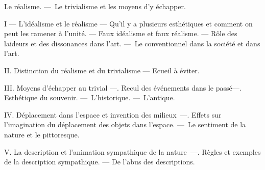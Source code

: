 \documentclass[french,twoside]{book} %
\newcommand\chaptercont{} %
\begin{document}
\begin{center}Le réalisme. — Le trivialisme et les moyens d’y échapper.\end{center}

\chaptercont
\noindent I — L’idéalisme et le réalisme — Qu’il y a plusieurs esthétiques et comment on peut les ramener à l’unité. — Faux idéalisme et faux réalisme. — Rôle des laideurs et des dissonances dans l’art. — Le conventionnel dans la société et dans l’art.\par
II. Distinction du réalisme et du trivialisme — Ecueil à éviter.\par
III. Moyens d’échapper au trivial —. Recul des événements dans le passé—. Esthétique du souvenir. — L’historique. — L’antique.\par
IV. Déplacement dans l’espace et invention des milieux —. Effets sur l’imagination du déplacement des objets dans l’espace. — Le sentiment de la nature et le pittoresque.\par
V. La description et l’animation sympathique de la nature —. Règles et exemples de la description sympathique. — De l’abus des descriptions.\par
\end{document}
